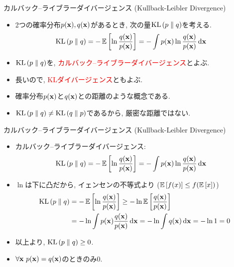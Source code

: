 \documentclass[dvipdfmx,notheorems,t]{beamer}
\begin{document}
\begin{frame}{カルバック--ライブラーダイバージェンス (Kullback-Leibler Divergence)}
\begin{itemize}
  \item 2つの確率分布$p(\vb{x}), q(\vb{x})$があるとき, 次の量$\operatorname{KL} \left( p \parallel q \right)$を考える.
  \begin{align*}
    \operatorname{KL} \left( p \parallel q \right) &= -\operatorname{\mathbb{E}} \left[ \ln \frac{q(\vb{x})}{p(\vb{x})} \right]
      = -\int p(\vb{x}) \ln \frac{q(\vb{x})}{p(\vb{x})} \dd{\vb{x}}
  \end{align*}
  \item $\operatorname{KL} \left( p \parallel q \right)$を, \textcolor{red}{カルバック--ライブラーダイバージェンス}とよぶ.
  \item 長いので, \textcolor{red}{KLダイバージェンス}ともよぶ.
  \item 確率分布$p(\vb{x})$と$q(\vb{x})$との距離のような概念である.
  \item $\operatorname{KL} \left( p \parallel q \right) \neq \operatorname{KL} \left( q \parallel p \right)$であるから, 厳密な距離ではない.
\end{itemize}
\end{frame}

\begin{frame}{カルバック--ライブラーダイバージェンス (Kullback-Leibler Divergence)}
\begin{itemize}
  \item カルバック--ライブラーダイバージェンス:
  \begin{align*}
    \operatorname{KL} \left( p \parallel q \right) &= -\operatorname{\mathbb{E}} \left[ \ln \frac{q(\vb{x})}{p(\vb{x})} \right]
      = -\int p(\vb{x}) \ln \frac{q(\vb{x})}{p(\vb{x})} \dd{\vb{x}}
  \end{align*}
  \item $\ln$は下に凸だから, イェンセンの不等式より ($\operatorname{\mathbb{E}} \left[ f(x) \right] \le f(\operatorname{\mathbb{E}} \left[ x \right])$)
  \begin{align*}
    \operatorname{KL} \left( p \parallel q \right) &= -\operatorname{\mathbb{E}} \left[ \ln \frac{q(\vb{x})}{p(\vb{x})} \right]
      \ge -\ln \operatorname{\mathbb{E}} \left[ \frac{q(\vb{x})}{p(\vb{x})} \right] \\
      &= -\ln \int p(\vb{x}) \frac{q(\vb{x})}{p(\vb{x})} \dd{\vb{x}}
      = -\ln \int q(\vb{x}) \dd{\vb{x}} = -\ln 1 = 0
  \end{align*}
  \item 以上より, $\operatorname{KL} \left( p \parallel q \right) \ge 0$.
  \item $\forall \vb{x} \ p(\vb{x}) = q(\vb{x})$のときのみ$0$.
\end{itemize}
\end{frame}
\end{document}
